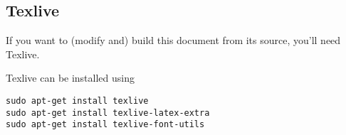\subsection{Texlive}

If you want to (modify and) build this document from its \tex source, you'll need Texlive.

Texlive can be installed using
\begin{lstlisting}[style=basic,style=bash]
sudo apt-get install texlive
sudo apt-get install texlive-latex-extra
sudo apt-get install texlive-font-utils
\end{lstlisting}
